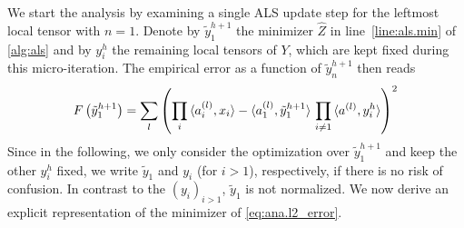 We start the analysis by examining a single ALS update step for the leftmost local tensor with $n = 1$.
Denote by $\tilde y^{h+1}_1$ the minimizer $\hat Z$ in line~\ref{line:als.min} of \cref{alg:als} and by $y^h_i$ the remaining local tensors of $Y$, which are kept fixed during this micro-iteration.
The empirical error as a function of $\tilde y^{h+1}_n$ then reads
\[
  F\left(\tilde y^{h+1}_1\right)
  = \sum_l {\left(  \prod_i \braket{a^{(l)}_i, x_i} - \braket{a^{(l)}_1, \tilde y^{h+1}_1} \, \prod_{i \neq 1} \braket{a^{(l)}, y^{h}_i} \right)}^2
  \label{eq:ana.l2_error}
\]
Since in the following, we only consider the optimization over $\tilde y^{h+1}_1$ and keep the other $y^h_i$ fixed, we write $\tilde y_1$ and $y_i$ (for $i > 1$), respectively, if there is no risk of confusion.
In contrast to the $(y_i)_{i > 1}$, $\tilde y_1$ is not normalized.
We now derive an explicit representation of the minimizer of \cref{eq:ana.l2_error}.

